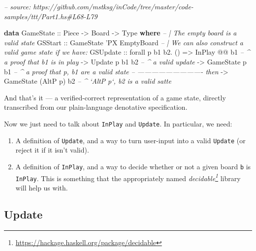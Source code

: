 \documentclass[]{article}
\newenvironment{Shaded}{}{}
\newcommand{\CommentTok}[1]{\textcolor[rgb]{0.38,0.63,0.69}{\textit{#1}}}
\newcommand{\DataTypeTok}[1]{\textcolor[rgb]{0.56,0.13,0.00}{#1}}
\newcommand{\FunctionTok}[1]{\textcolor[rgb]{0.02,0.16,0.49}{#1}}
\newcommand{\KeywordTok}[1]{\textcolor[rgb]{0.00,0.44,0.13}{\textbf{#1}}}
\newcommand{\NormalTok}[1]{#1}
\newcommand{\OtherTok}[1]{\textcolor[rgb]{0.00,0.44,0.13}{#1}}
\renewcommand{\href}[2]{#2\footnote{\url{#1}}}
\begin{document}
\begin{Shaded}
\begin{Highlighting}[]
\CommentTok{-- source: https://github.com/mstksg/inCode/tree/master/code-samples/ttt/Part1.hs#L68-L79}

\KeywordTok{data} \DataTypeTok{GameState}\OtherTok{ ::} \DataTypeTok{Piece} \OtherTok{->} \DataTypeTok{Board} \OtherTok{->} \DataTypeTok{Type} \KeywordTok{where}
    \CommentTok{-- | The empty board is a valid state}
    \DataTypeTok{GSStart}
\OtherTok{        ::} \DataTypeTok{GameState}\NormalTok{ '}\DataTypeTok{PX} \DataTypeTok{EmptyBoard}
    \CommentTok{-- | We can also construct a valid game state if we have:}
    \DataTypeTok{GSUpdate}
\OtherTok{        ::}\NormalTok{ forall p b1 b2}\FunctionTok{.}\NormalTok{ ()}
        \OtherTok{=>} \DataTypeTok{InPlay}          \FunctionTok{@@}\NormalTok{ b1     }\CommentTok{-- ^ a proof that b1 is in play}
        \OtherTok{->} \DataTypeTok{Update}\NormalTok{    p        b1 b2  }\CommentTok{-- ^ a valid update}
        \OtherTok{->} \DataTypeTok{GameState}\NormalTok{ p        b1     }\CommentTok{-- ^ a proof that p, b1 are a valid state}
        \CommentTok{-- ---------------------------- then}
        \OtherTok{->} \DataTypeTok{GameState}\NormalTok{ (}\DataTypeTok{AltP}\NormalTok{ p)    b2  }\CommentTok{-- ^ `AltP p`, b2 is a valid satte}
\end{Highlighting}
\end{Shaded}

And that's it --- a verified-correct representation of a game state, directly
transcribed from our plain-language denotative specification.

Now we just need to talk about \texttt{InPlay} and \texttt{Update}. In
particular, we need:

\begin{enumerate}
\def\labelenumi{\arabic{enumi}.}
\tightlist
\item
  A definition of \texttt{Update}, and a way to turn user-input into a valid
  \texttt{Update} (or reject it if it isn't valid).
\item
  A definition of \texttt{InPlay}, and a way to decide whether or not a given
  board \texttt{b} is \texttt{InPlay}. This is something that the appropriately
  named \emph{\href{https://hackage.haskell.org/package/decidable}{decidable}}
  library will help us with.
\end{enumerate}

\hypertarget{update}{%
\subsection{Update}\label{update}}
\end{document}
